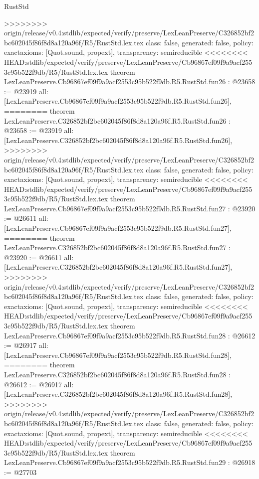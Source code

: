 \begin{lexlean}{RustStd}
\begin{coremodule}
{\begin{coremodule}
{{{{{{{{{{{{{{{{{{{{{{{{{{{{{>>>>>>>> origin/release/v0.4:stdlib/expected/verify/preserve/LexLeanPreserve/C326852bf2bc602045f86f8d8a120a96f/R5/RustStd.lex.tex
  class: false,
  generated: false,
  policy: exact{axioms: [Quot.sound, propext]},
  transparency: semireducible
}
<<<<<<<< HEAD:stdlib/expected/verify/preserve/LexLeanPreserve/Cb96867ef09f9a9acf2553c95b522f9db/R5/RustStd.lex.tex
theorem LexLeanPreserve.Cb96867ef09f9a9acf2553c95b522f9db.R5.RustStd.fun26 : @23658 := @23919 {
  all: [LexLeanPreserve.Cb96867ef09f9a9acf2553c95b522f9db.R5.RustStd.fun26],
========
theorem LexLeanPreserve.C326852bf2bc602045f86f8d8a120a96f.R5.RustStd.fun26 : @23658 := @23919 {
  all: [LexLeanPreserve.C326852bf2bc602045f86f8d8a120a96f.R5.RustStd.fun26],
>>>>>>>> origin/release/v0.4:stdlib/expected/verify/preserve/LexLeanPreserve/C326852bf2bc602045f86f8d8a120a96f/R5/RustStd.lex.tex
  class: false,
  generated: false,
  policy: exact{axioms: [Quot.sound, propext]},
  transparency: semireducible
}
<<<<<<<< HEAD:stdlib/expected/verify/preserve/LexLeanPreserve/Cb96867ef09f9a9acf2553c95b522f9db/R5/RustStd.lex.tex
theorem LexLeanPreserve.Cb96867ef09f9a9acf2553c95b522f9db.R5.RustStd.fun27 : @23920 := @26611 {
  all: [LexLeanPreserve.Cb96867ef09f9a9acf2553c95b522f9db.R5.RustStd.fun27],
========
theorem LexLeanPreserve.C326852bf2bc602045f86f8d8a120a96f.R5.RustStd.fun27 : @23920 := @26611 {
  all: [LexLeanPreserve.C326852bf2bc602045f86f8d8a120a96f.R5.RustStd.fun27],
>>>>>>>> origin/release/v0.4:stdlib/expected/verify/preserve/LexLeanPreserve/C326852bf2bc602045f86f8d8a120a96f/R5/RustStd.lex.tex
  class: false,
  generated: false,
  policy: exact{axioms: [Quot.sound, propext]},
  transparency: semireducible
}
<<<<<<<< HEAD:stdlib/expected/verify/preserve/LexLeanPreserve/Cb96867ef09f9a9acf2553c95b522f9db/R5/RustStd.lex.tex
theorem LexLeanPreserve.Cb96867ef09f9a9acf2553c95b522f9db.R5.RustStd.fun28 : @26612 := @26917 {
  all: [LexLeanPreserve.Cb96867ef09f9a9acf2553c95b522f9db.R5.RustStd.fun28],
========
theorem LexLeanPreserve.C326852bf2bc602045f86f8d8a120a96f.R5.RustStd.fun28 : @26612 := @26917 {
  all: [LexLeanPreserve.C326852bf2bc602045f86f8d8a120a96f.R5.RustStd.fun28],
>>>>>>>> origin/release/v0.4:stdlib/expected/verify/preserve/LexLeanPreserve/C326852bf2bc602045f86f8d8a120a96f/R5/RustStd.lex.tex
  class: false,
  generated: false,
  policy: exact{axioms: [Quot.sound, propext]},
  transparency: semireducible
}
<<<<<<<< HEAD:stdlib/expected/verify/preserve/LexLeanPreserve/Cb96867ef09f9a9acf2553c95b522f9db/R5/RustStd.lex.tex
theorem LexLeanPreserve.Cb96867ef09f9a9acf2553c95b522f9db.R5.RustStd.fun29 : @26918 := @27703 {
}}}}}}}}}}}}}}}}}}}}}}}}}}}}}}}}
\end{coremodule}}
\end{coremodule}
\end{lexlean}
